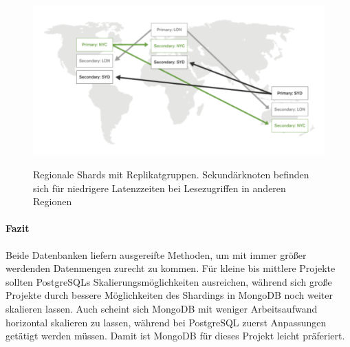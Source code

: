 \begin{figure}[ht]
	\centering
    \includegraphics[width=\textwidth]{sources/MongoDB_sharded.png}\cite{MG10}
	\caption{Regionale Shards mit Replikatgruppen. Sekundärknoten befinden sich für niedrigere Latenzzeiten bei Lesezugriffen in anderen Regionen}
	\label{fig1}
\end{figure}

\paragraph{Fazit\\}
Beide Datenbanken liefern ausgereifte Methoden, um mit immer größer werdenden Datenmengen zurecht zu kommen. Für kleine bis mittlere Projekte sollten PostgreSQLs Skalierungsmöglichkeiten ausreichen, während sich große Projekte durch bessere Möglichkeiten des Shardings in MongoDB noch weiter skalieren lassen. Auch scheint sich MongoDB mit weniger Arbeitsaufwand horizontal skalieren zu lassen, während bei PostgreSQL zuerst Anpassungen getätigt werden müssen. Damit ist MongoDB für dieses Projekt leicht präferiert.

